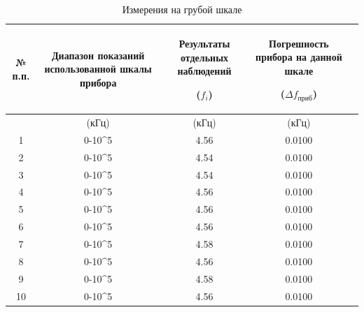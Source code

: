 \begin{center}
\begin{table}
\centering
\caption{Измерения на грубой шкале}
\label{tabl:1}
\begin{tabular}{|c|c|c|c|c|}
\hline
\begin{minipage}{7mm}
    № п.п. 
\end{minipage}&
\begin{minipage}{5cm}
\begin{center}
    Диапазон показаний использованной шкалы прибора
\end{center}
\end{minipage} &
\begin{minipage}{5cm}
\begin{center}
    Результаты отдельных наблюдений
    
    ($f_i$)
\end{center}
\end{minipage} &
\begin{minipage}{5cm}
\begin{center}
    Погрешность прибора на данной шкале
    
    ($\Delta f_{приб}$)
\end{center}
\end{minipage}\\
\hline
{}&(кГц)&(кГц)&(кГц)\\
\hline
1 & 0-10^5  &  4.56  &  0.0100 \\
2 & 0-10^5  &  4.54  &  0.0100 \\
3 & 0-10^5  &  4.54  &  0.0100 \\
4 & 0-10^5  &  4.56  &  0.0100 \\
5 & 0-10^5  &  4.56  &  0.0100 \\
6  & 0-10^5  &  4.56  &  0.0100 \\
7  & 0-10^5  &  4.58  &  0.0100 \\
8  & 0-10^5  &  4.56  &  0.0100 \\
9  & 0-10^5  &  4.58  &  0.0100 \\
10 & 0-10^5  &  4.56  &  0.0100 \\
\hline
\end{tabular}
\end{table}
\end{center}

